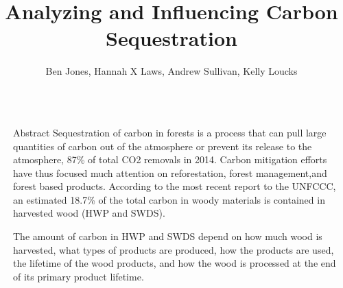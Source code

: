\documentclass[final]{beamer}\usepackage[]{graphicx}\usepackage[]{color}
\title{Analyzing and Influencing Carbon Sequestration}
\author{Ben Jones, Hannah X Laws, Andrew Sullivan, Kelly Loucks}
\institute{Department of Mathematical Sciences}
\newlength{\sepwid}
\newlength{\onecolwid}
\begin{document}

\setlength{\belowcaptionskip}{2ex} %
\setlength\belowdisplayshortskip{2ex} %

\begin{frame}[t] %


\begin{columns}[t] %

\begin{column}{\sepwid}\end{column} %

\begin{column}{\onecolwid} %


\begin{alertblock}{Abstract}
Sequestration of carbon in forests is a process that can pull large quantities of carbon out of the atmosphere or prevent its release to the atmosphere, 87\% of total CO2 removals in 2014. Carbon mitigation efforts have thus focused much attention on reforestation, forest management,and forest based products. According to the most recent report to the UNFCCC, an estimated 18.7\% of the total carbon in woody materials is contained in harvested wood (HWP and SWDS).  


The amount of carbon in HWP and SWDS depend on how much wood is harvested, what types of products are produced, how the products are used, the lifetime of the wood products, and how the wood is processed at the end of its primary product lifetime.


\end{alertblock}
\end{column}
\end{columns}
\end{frame}
\end{document}
